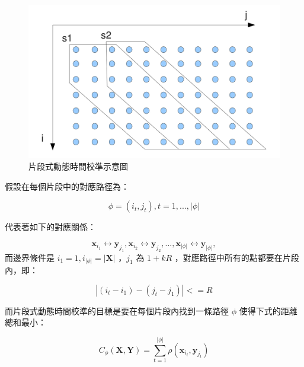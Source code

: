 \begin{figure}
\centering
\includegraphics[scale=0.3]{images/chap4_sdtw.png}
\caption{片段式動態時間校準示意圖~\cite{zhang2009unsupervised}} \label{fig:chap4_sdtw}
\end{figure}

假設在每個片段中的對應路徑為：

\[
\phi = (i_t, j_t), t = 1,...,|\phi|
\]

代表著如下的對應關係：

\[
\mathbf{x}_{i_1} \leftrightarrow \mathbf{y}_{j_1}, \mathbf{x}_{i_2} \leftrightarrow \mathbf{y}_{j_2},...,\mathbf{x}_{|\phi|} \leftrightarrow \mathbf{y}_{|\phi|},
\]
而邊界條件是 $i_1 = 1, i_{|\phi|} = |\mathbf{X}|$ ，$j_1$ 為 $1+kR$ ，對應路徑中所有的點都要在片段內，即：

\[
|(i_t-i_1)-(j_t-j_1)| <= R
\]

而片段式動態時間校準的目標是要在每個片段內找到一條路徑 $\phi$ 使得下式的距離總和最小：

\begin{equation}
C_{\phi}(\mathbf{X}, \mathbf{Y}) = \sum_{t=1}^{|\phi|} \rho(\mathbf{x}_{i_t},\mathbf{y}_{j_t})
\end{equation}

